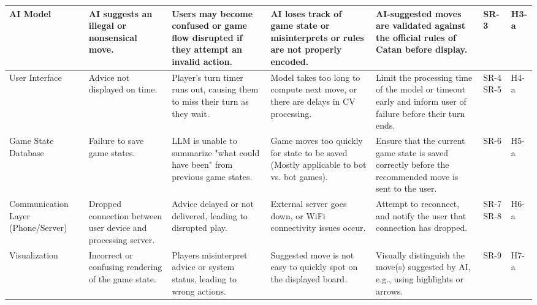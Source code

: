 \documentclass{article}
\begin{document}
\begin{landscape}
\begin{tabularx}{\linewidth}{|P{2.5cm}|Y|Y|Y|Y|P{1cm}|P{1cm}|}
        \hline

        AI Model &
        AI suggests an illegal or nonsensical move. &
        Users may become confused or game flow disrupted if they attempt an invalid action. &
        AI loses track of game state or misinterprets or rules are not properly encoded. &
        AI-suggested moves are validated against the official rules of Catan before display. &
        SR-3 &
        H3-a \\

        \hline

        User Interface &
        Advice not displayed on time. &
        Player's turn timer runs out, causing them to miss their turn as they wait. &
        Model takes too long to compute next move, or there are delays in CV processing. &
        Limit the processing time of the model or timeout early and inform user of failure before their turn ends. &
        SR-4 \newline SR-5 &
        H4-a \\

        \hline

        Game State Database &
        Failure to save game states. &
        LLM is unable to summarize "what could have been" from previous game states. &
        Game moves too quickly for state to be saved (Mostly applicable to bot vs. bot games). &
        Ensure that the current game state is saved correctly before the recommended move is sent to the user. &
        SR-6 &
        H5-a \\

        \hline

        Communication Layer (Phone/Server) &
        Dropped connection between user device and processing server. &
        Advice delayed or not delivered, leading to disrupted play. &
        External server goes down, or WiFi connectivity issues occur. &
        Attempt to reconnect, and notify the user that connection has dropped. &
        SR-7 \newline SR-8 &
        H6-a \\

        \hline

        Visualization &
        Incorrect or confusing rendering of the game state. &
        Players misinterpret advice or system status, leading to wrong actions. &
        Suggested move is not easy to quickly spot on the displayed board. &
        Visually distinguish the move(s) suggested by AI, e.g., using highlights or arrows. &
        SR-9 &
        H7-a \\

    \end{tabularx}
\end{landscape}
\end{document}
